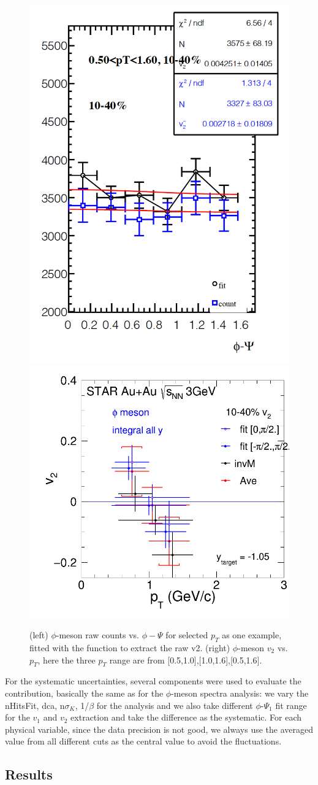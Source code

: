 \begin{figure}[h]
\includegraphics[width=0.45\linewidth]{chapterY/fig/phi_invEP_v2_10_40_fit.png}
\includegraphics[width=0.49\linewidth]{chapterY/fig/fig1_phi_v2_10_40.png}
  \caption{(left) $\phi$-meson raw counts vs. $\phi-\Psi$ for selected $p_T$ as one example, fitted with the function to extract the raw v2. (right) $\phi$-meson $v_2$ vs. $p_T$, here the three $p_T$ range are from [0.5,1.0],[1.0,1.6],[0.5,1.6].}
\label{phi_v2_fit_pT}
\end{figure}

For the systematic uncertainties, several components were used to evaluate the contribution, basically the same as for the $\phi$-meson spectra analysis: we vary the nHitsFit, dca, n$\sigma_{K}$, 1/$\beta$ for the analysis and we also take different $\phi$-$\Psi_{1}$ fit range for the $v_1$ and $v_2$ extraction and take the difference as the systematic. For each physical variable, since the data precision is not good, we always use the averaged value from all different cuts as the central value to avoid the fluctuations. 

\subsection{Results}
